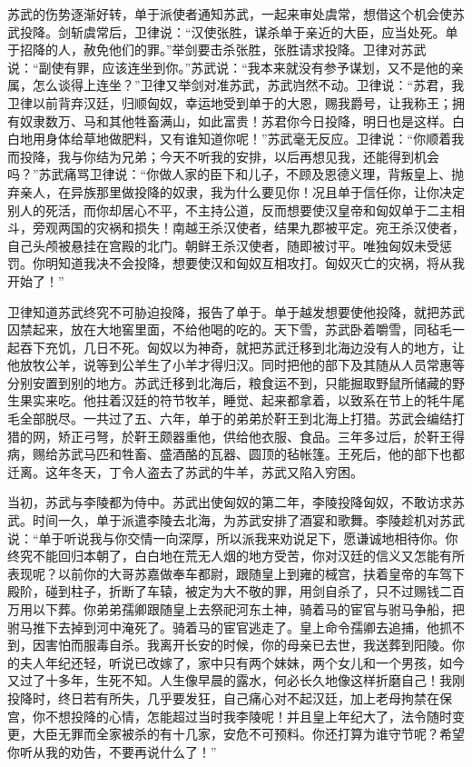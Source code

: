 \documentclass[12pt,UTF-8,openany,a4]{ctexbook}
\begin{document}
\begin{large}
    苏武的伤势逐渐好转，单于派使者通知苏武，一起来审处虞常，想借这个机会使苏武投降。剑斩虞常后，卫律说：“汉使张胜，谋杀单于亲近的大臣，应当处死。单于招降的人，赦免他们的罪。”举剑要击杀张胜，张胜请求投降。卫律对苏武说：“副使有罪，应该连坐到你。”苏武说：“我本来就没有参予谋划，又不是他的亲属，怎么谈得上连坐？”卫律又举剑对准苏武，苏武岿然不动。卫律说：“苏君，我卫律以前背弃汉廷，归顺匈奴，幸运地受到单于的大恩，赐我爵号，让我称王；拥有奴隶数万、马和其他牲畜满山，如此富贵！苏君你今日投降，明日也是这样。白白地用身体给草地做肥料，又有谁知道你呢！”苏武毫无反应。卫律说：“你顺着我而投降，我与你结为兄弟；今天不听我的安排，以后再想见我，还能得到机会吗？”苏武痛骂卫律说：“你做人家的臣下和儿子，不顾及恩德义理，背叛皇上、抛弃亲人，在异族那里做投降的奴隶，我为什么要见你！况且单于信任你，让你决定别人的死活，而你却居心不平，不主持公道，反而想要使汉皇帝和匈奴单于二主相斗，旁观两国的灾祸和损失！南越王杀汉使者，结果九郡被平定。宛王杀汉使者，自己头颅被悬挂在宫殿的北门。朝鲜王杀汉使者，随即被讨平。唯独匈奴未受惩罚。你明知道我决不会投降，想要使汉和匈奴互相攻打。匈奴灭亡的灾祸，将从我开始了！”
    
    卫律知道苏武终究不可胁迫投降，报告了单于。单于越发想要使他投降，就把苏武囚禁起来，放在大地窖里面，不给他喝的吃的。天下雪，苏武卧着嚼雪，同毡毛一起吞下充饥，几日不死。匈奴以为神奇，就把苏武迁移到北海边没有人的地方，让他放牧公羊，说等到公羊生了小羊才得归汉。同时把他的部下及其随从人员常惠等分别安置到别的地方。苏武迁移到北海后，粮食运不到，只能掘取野鼠所储藏的野生果实来吃。他拄着汉廷的符节牧羊，睡觉、起来都拿着，以致系在节上的牦牛尾毛全部脱尽。一共过了五、六年，单于的弟弟於靬王到北海上打猎。苏武会编结打猎的网，矫正弓弩，於靬王颇器重他，供给他衣服、食品。三年多过后，於靬王得病，赐给苏武马匹和牲畜、盛酒酪的瓦器、圆顶的毡帐篷。王死后，他的部下也都迁离。这年冬天，丁令人盗去了苏武的牛羊，苏武又陷入穷困。
    
    当初，苏武与李陵都为侍中。苏武出使匈奴的第二年，李陵投降匈奴，不敢访求苏武。时间一久，单于派遣李陵去北海，为苏武安排了酒宴和歌舞。李陵趁机对苏武说：“单于听说我与你交情一向深厚，所以派我来劝说足下，愿谦诚地相待你。你终究不能回归本朝了，白白地在荒无人烟的地方受苦，你对汉廷的信义又怎能有所表现呢？以前你的大哥苏嘉做奉车都尉，跟随皇上到雍的棫宫，扶着皇帝的车驾下殿阶，碰到柱子，折断了车辕，被定为大不敬的罪，用剑自杀了，只不过赐钱二百万用以下葬。你弟弟孺卿跟随皇上去祭祀河东土神，骑着马的宦官与驸马争船，把驸马推下去掉到河中淹死了。骑着马的宦官逃走了。皇上命令孺卿去追捕，他抓不到，因害怕而服毒自杀。我离开长安的时候，你的母亲已去世，我送葬到阳陵。你的夫人年纪还轻，听说已改嫁了，家中只有两个妹妹，两个女儿和一个男孩，如今又过了十多年，生死不知。人生像早晨的露水，何必长久地像这样折磨自己！我刚投降时，终日若有所失，几乎要发狂，自己痛心对不起汉廷，加上老母拘禁在保宫，你不想投降的心情，怎能超过当时我李陵呢！并且皇上年纪大了，法令随时变更，大臣无罪而全家被杀的有十几家，安危不可预料。你还打算为谁守节呢？希望你听从我的劝告，不要再说什么了！”
    

\end{large}
\end{document}
